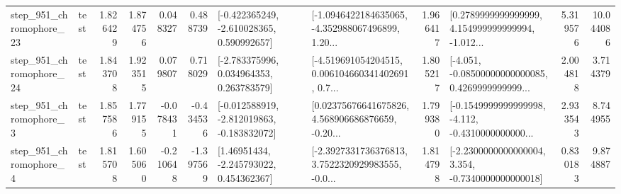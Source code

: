 \begin{tabular}{llrrrrllrlrr}
  step\_951\_chromophore\_23 &      test &      1.826429 &    1.874756 &      0.048327 &  0.488739 &   [-0.422365249, -2.610028365, 0.590992657] &  [-1.0946422184635065, -4.352988067496899, 1.20... &       1.966417 &  [0.2789999999999999, 4.154999999999994, -1.012... &            5.319576 &         10.044086 \\
  step\_951\_chromophore\_24 &      test &      1.843708 &    1.923515 &      0.079807 &  0.718029 &    [-2.783375996, 0.034964353, 0.263783579] &  [-4.519691054204515, 0.006104660341402691, 0.7... &       1.805217 &  [-4.051, -0.08500000000000085, 0.4269999999999... &            2.004818 &          3.714379 \\
   step\_951\_chromophore\_3 &      test &      1.857586 &    1.779155 &     -0.078431 & -0.434536 &  [-0.012588919, -2.812019863, -0.183832072] &  [0.02375676641675826, 4.568906686876659, -0.20... &       1.799380 &  [-0.1549999999999998, -4.112, -0.4310000000000... &            2.933543 &          8.744955 \\
   step\_951\_chromophore\_4 &      test &      1.815708 &    1.605060 &     -0.210648 & -1.397569 &     [1.46951434, -2.245793022, 0.454362367] &  [-2.3927331736376813, 3.7522320929983555, -0.0... &       1.814798 &  [-2.2300000000000004, 3.354, -0.7340000000000018] &            0.830183 &          9.874887 \\
\bottomrule
\end{tabular}

